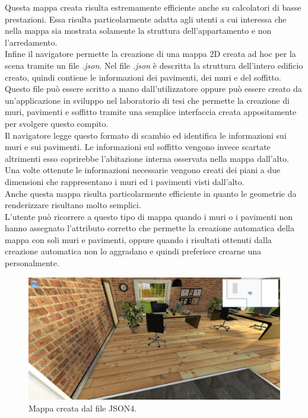 Questa mappa creata risulta estremamente efficiente anche su calcolatori di basse prestazioni. Essa risulta particolarmente adatta agli utenti a cui interessa che nella mappa sia mostrata solamente la struttura dell’appartamento e non l’arredamento.
\\

Infine il navigatore permette la creazione di una mappa 2D creata ad hoc per la scena tramite un file \emph{.json}.
Nel file \emph{.json} è descritta la struttura dell’intero edificio creato, quindi contiene le informazioni dei pavimenti, dei muri e del soffitto.
\\
Questo file può essere scritto a mano dall’utilizzatore oppure può essere creato da un’applicazione in sviluppo nel laboratorio di tesi che permette la creazione di muri, pavimenti e soffitto tramite una semplice interfaccia creata appositamente per svolgere questo compito.
\\
Il navigatore legge questo formato di scambio ed identifica le informazioni sui muri e sui pavimenti. Le informazioni sul soffitto vengono invece scartate altrimenti esso coprirebbe l’abitazione interna osservata nella mappa dall’alto.
Una volte ottenute le informazioni necessarie vengono creati dei piani a due dimensioni che rappresentano i muri ed i pavimenti visti dall’alto.
\\
Anche questa mappa risulta particolarmente efficiente in quanto le geometrie da renderizzare risultano molto semplici.
\\
L’utente può ricorrere a questo tipo di mappa quando i muri o i pavimenti non hanno assegnato l’attributo corretto che permette la creazione automatica della mappa con soli muri e pavimenti, oppure quando i risultati ottenuti dalla creazione automatica non lo aggradano e quindi preferisce crearne una personalmente.
\begin{figure}[htb]
 \centering
 \includegraphics[width=1\linewidth]{images/chapter_navigazione_scena/map_2d_json.png}\hfill
 \caption[Mappa creata dal file JSON4.]{Mappa creata dal file JSON4.}
 \label{fig:navigazione_scena_map_2d_json}
\end{figure}